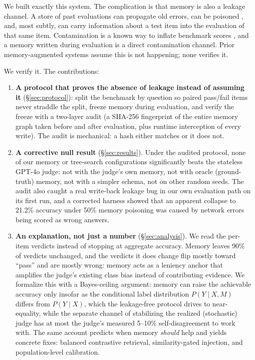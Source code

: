 \documentclass[11pt]{article}
\begin{document}
We built exactly this system. The complication is that memory is also a leakage channel. A store of past evaluations can propagate old errors, can be poisoned \citep{rag_poisoning2024}, and, most subtly, can carry information about a test item into the evaluation of that same item. Contamination is a known way to inflate benchmark scores \citep{data_contamination2024, benchmark_contamination2024, eval_leakage2024}, and a memory written during evaluation is a direct contamination channel. Prior memory-augmented systems assume this is not happening; none verifies it.

We verify it. The contributions:

\begin{enumerate}
    \item \textbf{A protocol that proves the absence of leakage instead of assuming it} (\S\ref{sec:protocol}): split the benchmark by question so paired pass/fail items never straddle the split, freeze memory during evaluation, and verify the freeze with a two-layer audit (a SHA-256 fingerprint of the entire memory graph taken before and after evaluation, plus runtime interception of every write). The audit is mechanical: a hash either matches or it does not.
    \item \textbf{A corrective null result} (\S\ref{sec:results}). Under the audited protocol, none of our memory or tree-search configurations significantly beats the stateless GPT-4o judge: not with the judge's own memory, not with oracle (ground-truth) memory, not with a simpler schema, not on other random seeds. The audit also caught a real write-back leakage bug in our own evaluation path on its first run, and a corrected harness showed that an apparent collapse to 21.2\% accuracy under 50\% memory poisoning was caused by network errors being scored as wrong answers.
    \item \textbf{An explanation, not just a number} (\S\ref{sec:analysis}). We read the per-item verdicts instead of stopping at aggregate accuracy. Memory leaves 90\% of verdicts unchanged, and the verdicts it does change flip mostly toward ``pass'' and are mostly wrong: memory acts as a leniency anchor that amplifies the judge's existing class bias instead of contributing evidence. We formalize this with a Bayes-ceiling argument: memory can raise the achievable accuracy only insofar as the conditional label distribution $P(Y\mid X,M)$ differs from $P(Y\mid X)$, which the leakage-free protocol drives to near-equality, while the separate channel of stabilizing the realized (stochastic) judge has at most the judge's measured 5--10\% self-disagreement to work with. The same account predicts when memory \emph{should} help and yields concrete fixes: balanced contrastive retrieval, similarity-gated injection, and population-level calibration.
\end{enumerate}
\end{document}
